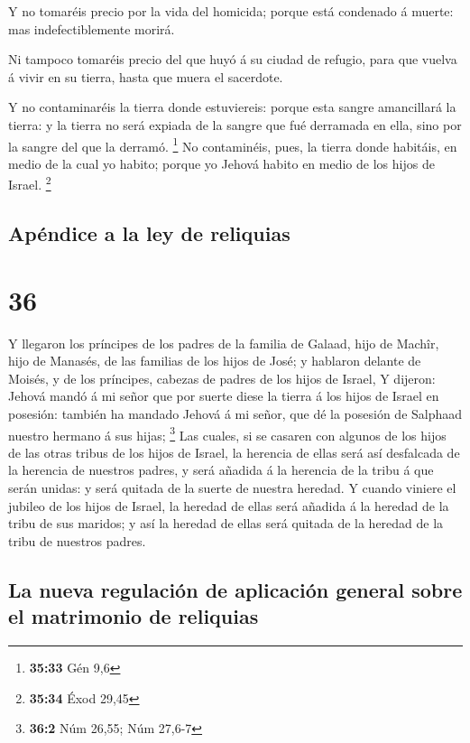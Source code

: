  Y no tomaréis precio por la vida del homicida; porque está
condenado á muerte: mas indefectiblemente morirá.

 Ni tampoco tomaréis precio del que huyó á su ciudad de
refugio, para que vuelva á vivir en su tierra, hasta que muera el
sacerdote.

 Y no contaminaréis la tierra donde estuviereis: porque
esta sangre amancillará la tierra: y la tierra no será expiada de la
sangre que fué derramada en ella, sino por la sangre del que la derramó.
\footnote{\textbf{35:33} Gén 9,6}  No contaminéis, pues, la
tierra donde habitáis, en medio de la cual yo habito; porque yo Jehová
habito en medio de los hijos de Israel. \footnote{\textbf{35:34} Éxod
  29,45}

\hypertarget{apuxe9ndice-a-la-ley-de-reliquias}{%
\subsection{Apéndice a la ley de
reliquias}\label{apuxe9ndice-a-la-ley-de-reliquias}}

\hypertarget{section-35}{%
\section{36}\label{section-35}}

 Y llegaron los príncipes de los padres de la familia de
Galaad, hijo de Machîr, hijo de Manasés, de las familias de los hijos de
José; y hablaron delante de Moisés, y de los príncipes, cabezas de
padres de los hijos de Israel,  Y dijeron: Jehová mandó á mi
señor que por suerte diese la tierra á los hijos de Israel en posesión:
también ha mandado Jehová á mi señor, que dé la posesión de Salphaad
nuestro hermano á sus hijas; \footnote{\textbf{36:2} Núm 26,55; Núm
  27,6-7}  Las cuales, si se casaren con algunos de los
hijos de las otras tribus de los hijos de Israel, la herencia de ellas
será así desfalcada de la herencia de nuestros padres, y será añadida á
la herencia de la tribu á que serán unidas: y será quitada de la suerte
de nuestra heredad.  Y cuando viniere el jubileo de los
hijos de Israel, la heredad de ellas será añadida á la heredad de la
tribu de sus maridos; y así la heredad de ellas será quitada de la
heredad de la tribu de nuestros padres.

\hypertarget{la-nueva-regulaciuxf3n-de-aplicaciuxf3n-general-sobre-el-matrimonio-de-reliquias}{%
\subsection{La nueva regulación de aplicación general sobre el
matrimonio de
reliquias}\label{la-nueva-regulaciuxf3n-de-aplicaciuxf3n-general-sobre-el-matrimonio-de-reliquias}}

